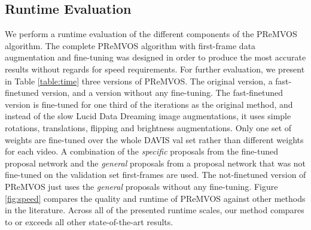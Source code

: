 \documentclass[runningheads]{llncs}
\begin{document}
\subsection{Runtime Evaluation}
\label{sec:runtime}
We perform a runtime evaluation of the different components of the PReMVOS algorithm. The complete PReMVOS algorithm with first-frame data augmentation and fine-tuning was designed in order to produce the most accurate results without regards for speed requirements. For further evaluation, we present in Table \ref{table:time} three versions of PReMVOS. The original version, a fast-finetuned version, and a version without any fine-tuning. The fast-finetuned version is fine-tuned for one third of the iterations as the original method, and instead of the slow Lucid Data Dreaming \cite{khoreva2017lucid} image augmentations, it uses simple rotations, translations, flipping and brightness augmentations. Only one set of weights are fine-tuned over the whole DAVIS val set rather than different weights for each video. A combination of the \textit{specific} proposals from the fine-tuned proposal network and the \textit{general} proposals from a proposal network that was not fine-tuned on the validation set first-frames are used. The not-finetuned version of PReMVOS just uses the \textit{general} proposals without any fine-tuning.
Figure \ref{fig:speed} compares the quality and runtime of PReMVOS against other methods in the literature. Across all of the presented runtime scales, our method compares to or exceeds all other state-of-the-art results.
\end{document}
